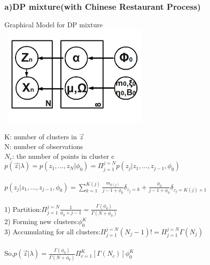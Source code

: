 \documentclass{article}
\begin{document}
\begin{spacing}{1.1}
\subsubsection*{a)DP mixture(with Chinese Restaurant Process)}
\begin{center}
 Graphical Model for DP mixture\\
    \includegraphics[width=3in,height=2in]{dp.jpg} 
\end{center}
K: number of clusters in $\vec z$ \\   
N: number of observations\\ 
$N_{c}$: the number of points in cluster c\\ 
$p(\vec z|\lambda)=p(z_{1},...,z_{N}|\phi_{0})=\Pi_{j=1}^{j=N}p(z_{j}|z_{1},...,z_{j-1},\phi_{0})$\\ \\
$p(z_{j}|z_{1},...,z_{j-1},\phi_{0})=\sum_{k=1}^{K(j)}\frac{m_{k(j)}}{j-1+\phi_{0}}\delta_{z_{j}=k}+\frac{\phi_{0}}{j-1+\phi_{0}}\delta_{z_{j}=K(j)+1}$\\ \\
1) Partition:$\Pi_{j=1}^{j=N}\frac{1}{\phi_{0}+j-1}=\frac{\Gamma(\phi_{0})}{\Gamma(N+\phi_{0})}$\\ 
2) Forming new clusters:$\phi_{0}^{K}$\\ 
3) Accumulating for all clusters:$\Pi_{j=1}^{j=N}(N_{j}-1)!=\Pi_{j=1}^{j=N}\Gamma(N_{j})$\\ \\
So,$p(\vec z|\lambda)=\frac{\Gamma(\phi_{0})}{\Gamma(N+\phi_{0})}\Pi_{c=1}^{K}[\Gamma(N_{c})]\phi_{0}^{K}$

\end{spacing}
\end{document}

